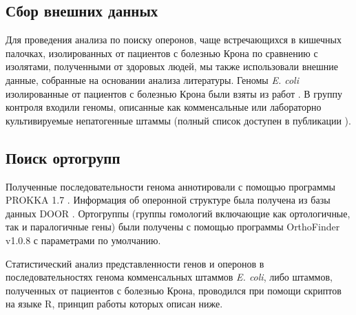 \subsection{Сбор внешних данных}
Для проведения анализа по поиску оперонов, чаще встречающихся в кишечных палочках, изолированных от пациентов с болезнью Крона по сравнению с изолятами, полученными от здоровых людей, мы также использовали внешние данные, собранные на основании анализа литературы. Геномы \textit{E. coli} изолированные от пациентов с болезнью Крона были взяты из работ \cite{nash2010genome, miquel2010complete, krause2011complete}. В группу контроля входили геномы, описанные как комменсальные или лабораторно культивируемые непатогенные штаммы (полный список доступен в публикации \cite{rakitina2017genome}).

\subsection{Поиск ортогрупп}
Полученные последовательности генома аннотировали с помощью программы PROKKA 1.7 \cite{seemann2014prokka}. Информация об оперонной структуре была получена из базы данных DOOR \cite{mao2014door}. Ортогруппы (группы гомологий включающие как ортологичные, так и паралогичные гены) были получены с помощью программы OrthoFinder v1.0.8 \cite{emms2015orthofinder} с параметрами по умолчанию. 

Статистический анализ представленности генов и оперонов в последовательностях генома комменсальных штаммов \textit{E. coli}, либо штаммов, полученных от пациентов с болезнью Крона, проводился при помощи скриптов на языке R, принцип работы которых описан ниже.
